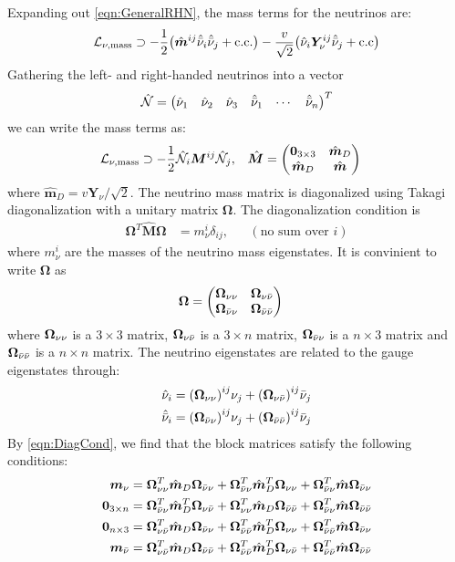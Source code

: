 Expanding out \ref{eqn:GeneralRHN}, the mass terms for the neutrinos are:
\begin{align}\label{eqn:RHNMass}
	\mathcal{L}_{\nu,\mathrm{mass}}\supset
	-\frac{1}{2}\qty(\hat{\bm{m}}^{ij}\hat{\bar{\nu}}_i\hat{\bar{\nu}}_j + \mathrm{c.c.})
	- \frac{v}{\sqrt{2}}\qty(\hat{\nu}_{i}\bm{Y}^{ij}_{\nu}\hat{\bar{\nu}}_{j} + \mathrm{c.c})
\end{align}
Gathering the left- and right-handed neutrinos into a vector
\begin{align}
	\hat{\cN} = \mqty(\hat{\nu}_1 & \hat{\nu}_2 & \hat{\nu}_3 & \hat{\rhn}_1 & \cdots & \hat{\rhn}_n)^{T}
\end{align}
we can write the mass terms as:
\begin{align}\label{eqn:RHNMassMatrix}
	\cL_{\nu,\mathrm{mass}}
	                  & \supset
	-\frac{1}{2}\hat{\cN}_{i}\bm{M}^{ij}\hat{\cN}_j,
	                  &
	\hat{\bm{M}}      & = \mqty(
	\bm{0}_{3\times3} & \hat{\bm{m}}_{D} \\
	\hat{\bm{m}}_{D}  & \hat{\bm{m}}
	)
\end{align}
where \(\hat{\bm{m}}_{D} = v\bm{Y}_{\nu}/\sqrt{2}\). The neutrino mass matrix is diagonalized
using Takagi diagonalization with a unitary matrix \(\bm{\Omega}\). The diagonalization condition
is
\begin{align}\label{eqn:DiagCond}
	\bm{\Omega}^{T}\hat{\bm{M}}\bm{\Omega} & = m^{i}_{\nu}\delta_{ij}, &  & (\text{no sum over } i)
\end{align}
where \(m^{i}_{\nu}\) are the masses of the neutrino mass eigenstates. It is convinient to
write \(\bm{\Omega}\) as
\begin{align}\label{eqn:OmegaDef}
	\bm{\Omega} & = \mqty(\OmegaVVb & \OmegaVNb \\ \OmegaNVb & \OmegaNNb)
\end{align}
where \(\bm{\Omega}_{\nu\nu}\) is a \(3\times3\) matrix, \(\bm{\Omega}_{\nu\bar{\nu}}\) is a \(3\times n\) matrix,
\(\bm{\Omega}_{\bar{\nu}\nu}\) is a \(n\times3\) matrix and \(\bm{\Omega}_{\bar{\nu}\bar{\nu}}\) is a \(n\times n\) matrix.
The neutrino eigenstates are related to the gauge eigenstates through:
\begin{align}
	\hat{\nu}_{i}  & = \qty(\bm{\Omega}_{\nu\nu})^{ij}\nu_j + \qty(\bm{\Omega}_{\nu\bar{\nu}})^{ij}\bar{\nu}_j \\
	\hat{\bar{\nu}}_{i} & = \qty(\bm{\Omega}_{\bar{\nu}\nu})^{ij}\nu_j + \qty(\bm{\Omega}_{\bar{\nu}\bar{\nu}})^{ij}\bar{\nu}_j
\end{align}
By \ref{eqn:DiagCond}, we find that the block matrices satisfy the following conditions:
\begin{align}
	\bm{m}_{\nu}       & =
	\bm{\Omega}_{\nu\nu}^{T}\hat{\bm{m}}_{D}\bm{\Omega}_{\bar{\nu}\nu}+\bm{\Omega}_{\bar{\nu}\nu}^{T}\hat{\bm{m}}^{T}_{D}\bm{\Omega}_{\nu\nu}+\bm{\Omega}_{\bar{\nu}\nu}^{T}\hat{\bm{m}}\bm{\Omega}_{\bar{\nu}\nu} \\
	\bm{0}_{3\times n} & =
	\bm{\Omega}_{\bar{\nu}\nu}^{T}\hat{\bm{m}}^{T}_{D}\bm{\Omega}_{\nu\bar{\nu}}+\bm{\Omega}_{\nu\nu}^{T}\hat{\bm{m}}_{D}\bm{\Omega}_{\bar{\nu}\bar{\nu}}+\bm{\Omega}_{\bar{\nu}\nu}^{T}\hat{\bm{m}}\bm{\Omega}_{\bar{\nu}\bar{\nu}} \\
	\bm{0}_{n\times 3} & =
	\bm{\Omega}_{\nu\bar{\nu}}^{T}\hat{\bm{m}}_{D}\bm{\Omega}_{\bar{\nu}\nu}
	+\bm{\Omega}_{\bar{\nu}\bar{\nu}}^{T}\hat{\bm{m}}^{T}_{D}\bm{\Omega}_{\nu\nu}
	+\bm{\Omega}_{\bar{\nu}\bar{\nu}}^{T} \hat{\bm{m}}\bm{\Omega}_{\bar{\nu}\nu}                                                                                 \\
	\bm{m}_{\bar{\nu}}      & =
	\bm{\Omega}_{\nu\bar{\nu}}^{T}\hat{\bm{m}}_{D}\bm{\Omega}_{\bar{\nu}\bar{\nu}}
	+\bm{\Omega}_{\bar{\nu}\bar{\nu}}^{T}\hat{\bm{m}}^{T}_{D}\bm{\Omega}_{\nu\bar{\nu}}
	+\bm{\Omega}_{\bar{\nu}\bar{\nu}}^{T} \hat{\bm{m}}\bm{\Omega}_{\bar{\nu}\bar{\nu}}
\end{align}
